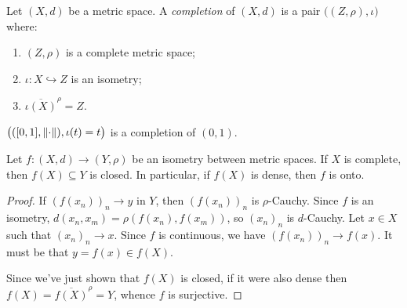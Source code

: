    \begin{center}
    \end{center}

    \begin{definition}
        Let $(X,d)$ be a metric space. A \textit{completion} of $(X,d)$ is a pair $\bigl((Z,\rho),\iota\bigr)$ where:
            \begin{enumerate}[label = (\arabic*),itemsep=1pt,topsep=3pt]
                \item $(Z,\rho)$ is a complete metric space;
                \item $\iota:X \hookrightarrow Z$ is an isometry;
                \item $\overline{\iota(X)}^\rho = Z$.
            \end{enumerate}
    \end{definition}

    \begin{example}
        $\bigl(([0,1],\left\lVert \cdot \right\rVert), \iota(t) = t\bigr)$ is a completion of $(0,1)$.
    \end{example}

    \begin{lemma}\label{lemma:isometry-closed}
        Let $f:(X,d) \rightarrow (Y,\rho)$ be an isometry between metric spaces. If $X$ is complete, then $f(X) \subseteq Y$ is closed. In particular, if $f(X)$ is dense, then $f$ is onto. 
    \end{lemma}
        \begin{proof}
            If $(f(x_n))_n \rightarrow y$ in $Y$, then $(f(x_n))_n$ is $\rho$-Cauchy. Since $f$ is an isometry, $d(x_n,x_m) = \rho(f(x_n),f(x_m))$, so $(x_n)_n$ is $d$-Cauchy. Let $x \in X$ such that $(x_n)_n \rightarrow x$. Since $f$ is continuous, we have $(f(x_n))_n \rightarrow f(x)$. It must be that $y = f(x) \in f(X)$.

            Since we've just shown that $f(X)$ is closed, if it were also dense then $f(X) = \overline{f(X)}^\rho = Y$, whence $f$ is surjective.
        \end{proof}

